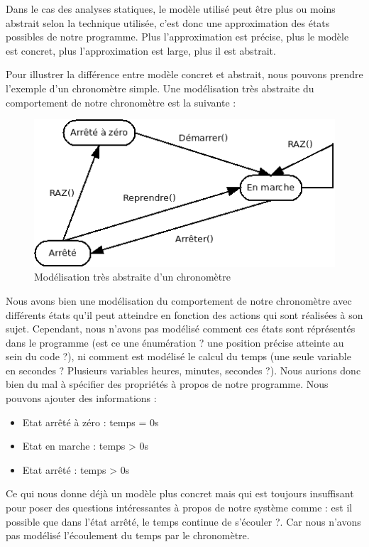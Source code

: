 \documentclass[12pt,francais,]{scrbook}
\providecommand{\tightlist}{%
  \setlength{\itemsep}{0pt}\setlength{\parskip}{0pt}}
\begin{document}
Dans le cas des analyses statiques, le modèle utilisé peut être plus ou
moins abstrait selon la technique utilisée, c'est donc une approximation
des états possibles de notre programme. Plus l'approximation est
précise, plus le modèle est concret, plus l'approximation est large,
plus il est abstrait.

Pour illustrer la différence entre modèle concret et abstrait, nous
pouvons prendre l'exemple d'un chronomètre simple. Une modélisation très
abstraite du comportement de notre chronomètre est la suivante :

\begin{figure}[htbp]
\centering
\includegraphics[scale=0.5]{1-1-model.png}
\caption{Modélisation très abstraite d'un chronomètre}
\end{figure}

Nous avons bien une modélisation du comportement de notre chronomètre
avec différents états qu'il peut atteindre en fonction des actions qui
sont réalisées à son sujet. Cependant, nous n'avons pas modélisé comment
ces états sont réprésentés dans le programme (est ce une énumération ?
une position précise atteinte au sein du code ?), ni comment est
modélisé le calcul du temps (une seule variable en secondes ? Plusieurs
variables heures, minutes, secondes ?). Nous aurions donc bien du mal à
spécifier des propriétés à propos de notre programme. Nous pouvons
ajouter des informations :

\begin{itemize}
\tightlist
\item
  Etat arrêté à zéro : temps = 0s
\item
  Etat en marche : temps \textgreater{} 0s
\item
  Etat arrêté : temps \textgreater{} 0s
\end{itemize}

Ce qui nous donne déjà un modèle plus concret mais qui est toujours
insuffisant pour poser des questions intéressantes à propos de notre
système comme : \og{}est il possible que dans l'état arrêté, le temps
continue de s'écouler ?\fg{}. Car nous n'avons pas modélisé l'écoulement du
temps par le chronomètre.
\end{document}
